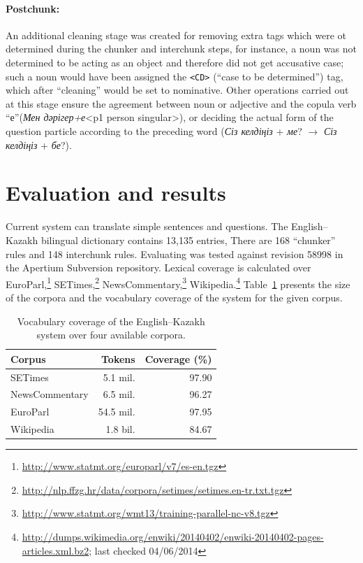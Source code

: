 \documentclass[11pt]{article}
\begin{document}
\paragraph{Postchunk:}
An additional cleaning stage was created for removing extra tags which were ot determined during the chunker and 
interchunk steps, for instance, a noun was not determined to be acting as an object and therefore did not get accusative case; such a noun would have been assigned the  \texttt{<CD>} (``case to be determined'') tag, which after ``cleaning'' would be set to nominative. Other operations  carried out at this stage ensure
the agreement between noun or adjective and the copula verb ``е''(\emph{Мен дәрігер+е}<p1 person singular>),  or deciding the actual form of the question particle according to the preceding word (\emph{Сіз келдіңіз} + \emph{ме}? \(\to\) \emph{Сіз келдіңіз} + \emph{бе}?).

\section{Evaluation and results}

Current system can translate simple sentences and questions. The English--Kazakh bilingual dictionary 
contains 13,135 entries,  There are 168 ``chunker'' rules and 148 interchunk rules. 
Evaluating was tested against revision 58998 in the Apertium Subversion repository. Lexical coverage is calculated 
over EuroParl,\footnote{\url{http://www.statmt.org/europarl/v7/es-en.tgz}} SETimes,\footnote{\url{http://nlp.ffzg.hr/data/corpora/setimes/setimes.en-tr.txt.tgz}} NewsCommentary,\footnote{\url{http://www.statmt.org/wmt13/training-parallel-nc-v8.tgz}} Wikipedia.\footnote{\url{http://dumps.wikimedia.org/enwiki/20140402/enwiki-20140402-pages-articles.xml.bz2}; last checked 04/06/2014} 
Table~\ref{table:coverage} presents the size of the corpora and the vocabulary coverage of the system for the given corpus.

\begin{table}
  \centering
  \begin{tabular}{|l|r|r|}
    \hline
    \textbf{Corpus} & \textbf{Tokens} & \textbf{Coverage} (\%) \\
    \hline
    SETimes & 5.1 mil. & 97.90 \\
    NewsCommentary & 6.5 mil. & 96.27 \\
    EuroParl & 54.5 mil. & 97.95 \\
    Wikipedia & 1.8 bil. & 84.67 \\
    \hline
  \end{tabular}
  \caption{Vocabulary coverage of the English--Kazakh system over four available corpora.}
  \label{table:coverage}
\end{table}
\end{document}
